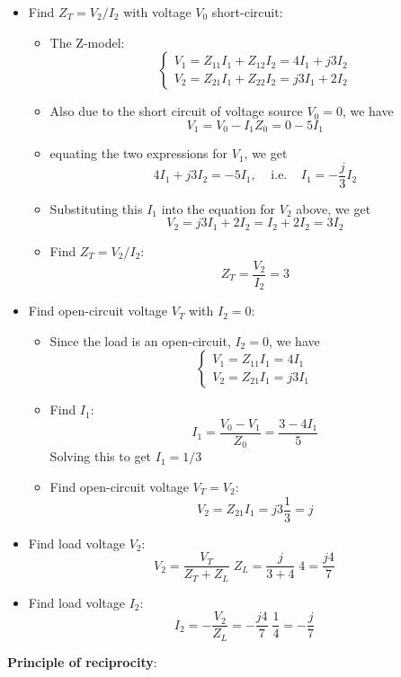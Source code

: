 \begin{itemize}
\item Find $Z_T=V_2/I_2$ with voltage $V_0$ short-circuit:
  \begin{itemize}
  \item The Z-model:
    \[ \left\{ \begin{array}{l} V_1=Z_{11}I_1+Z_{12}I_2=4I_1+j3I_2	\\
      V_2=Z_{21}I_1+Z_{22}I_2=j3I_1+2I_2 \end{array} \right. \]
  \item Also due to the short circuit of voltage source $V_0=0$, we have
    \[ V_1=V_0-I_1 Z_0=0-5I_1	\]
  \item equating the two expressions for $V_1$, we get
    \[ 4I_1+j3I_2=-5I_1,\;\;\;\;\mbox{i.e.}\;\;\;\;I_1=-\frac{j}{3} I_2	\]
  \item Substituting this $I_1$ into the equation for $V_2$ above, we get
    \[ V_2=j3I_1+2I_2=I_2+2I_2=3I_2 \]
  \item Find $Z_T=V_2/I_2$:
    \[ Z_T=\frac{V_2}{I_2}=3	\]
  \end{itemize}
\item Find open-circuit voltage $V_T$ with $I_2=0$:
  \begin{itemize}
  \item Since the load is an open-circuit, $I_2=0$, we have
    \[ \left\{ \begin{array}{l} V_1=Z_{11}I_1=4I_1 \\
      V_2=Z_{21}I_1=j3 I_1 \end{array} \right. \]
    \item Find $I_1$:
      \[	I_1=\frac{V_0-V_1}{Z_0}=\frac{3-4I_1}{5}	\]
      Solving this to get $I_1=1/3$
    \item Find open-circuit voltage $V_T=V_2$:
      \[	V_2=Z_{21}I_1=j3 \frac{1}{3}=j	\]
  \end{itemize}
\item Find load voltage $V_2$:
  \[ V_2=\frac{V_T}{Z_T+Z_L}\;Z_L=\frac{j}{3+4}\;4=\frac{j4}{7} \]
\item Find load voltage $I_2$:
  \[ I_2=-\frac{V_2}{Z_L}=-\frac{j4}{7}\;\frac{1}{4}=-\frac{j}{7} \]
\end{itemize}


{\bf Principle of reciprocity}:
 

